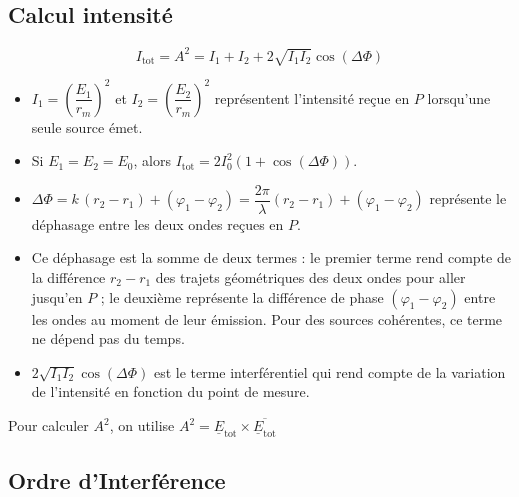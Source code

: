 \documentclass[a4paper,12pt]{article}
\begin{document}
\begin{minipage}[c]{0.5\textwidth}
    \end{minipage}

    
    \subsection*{Calcul intensité}
        $$ I_{\text{tot}} = A^2 = I_1 + I_2 + 2\sqrt{I_1 I_2} \cos(\Delta \Phi) $$
        \begin{itemize}
            \item $I_1 = \left(\dfrac{E_1}{r_m}\right)^2$ et $I_2 = \left(\dfrac{E_2}{r_m}\right)^2$ représentent l'intensité reçue en $P$ lorsqu'une seule source émet.
            \item Si $E_1 = E_2 = E_0$, alors $I_{\text{tot}} = 2I_0^2 (1 + \cos(\Delta \Phi)) $.
            \item $\Delta \Phi = k\,(r_2 - r_1) + (\varphi_1 - \varphi_2) = \dfrac{2\pi}{\lambda}(r_2 - r_1) + (\varphi_1 - \varphi_2)$ représente le déphasage entre les deux ondes reçues en $P$.
            \item Ce déphasage est la somme de deux termes : le premier terme rend compte de la différence $r_2 - r_1$ des trajets géométriques des deux ondes pour aller jusqu'en $P$ ; le deuxième représente la différence de phase $(\varphi_1 - \varphi_2)$ entre les ondes au moment de leur émission. Pour des sources cohérentes, ce terme ne dépend pas du temps.
            \item $2\sqrt{I_1 I_2} \cos(\Delta \Phi)$ est le terme interférentiel qui rend compte de la variation de l'intensité en fonction du point de mesure.
        \end{itemize}
        Pour calculer $A^2$, on utilise $A^2 = \underline{E}_{\text{tot}} \times \overline{\underline{E}_{\text{tot}}}$
    
    \subsection{Ordre d'Interférence}
        
\end{document}

